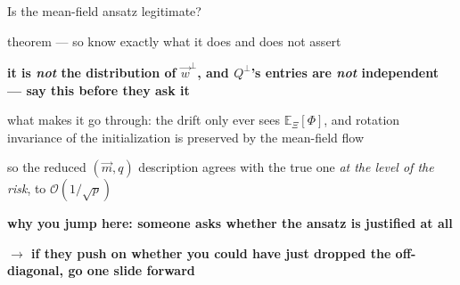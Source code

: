 \documentclass[aspectratio=169,11pt]{beamer}
\begin{document}
\begin{frame}{Is the mean-field ansatz legitimate?}
{\begin{notelist}
      theorem --- so know exactly what it does and does not assert
    \item \textbf{it is \emph{not} the distribution of $\vec{w}^\bot$, and
      $Q^\bot$'s entries are \emph{not} independent --- say this before they
      ask it}
    \item what makes it go through: the drift only ever sees
      $\mathbb{E}_\Xi[\Phi]$, and rotation invariance of the initialization is
      preserved by the mean-field flow 
    \item so the reduced $(\vec{m}, q)$ description agrees with the true one
      \emph{at the level of the risk}, to $\mathcal{O}(1/\sqrt{p})$
    \item \textbf{why you jump here: someone asks whether the ansatz is
      justified at all}
    \item \textbf{$\to$ if they push on whether you could have just dropped the
      off-diagonal, go one slide forward}
  \end{notelist}}
\end{frame}
\end{document}
